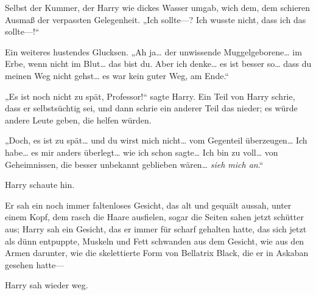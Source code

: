 Selbst der Kummer, der Harry wie dickes Wasser umgab, wich dem, dem schieren Ausmaß der verpassten Gelegenheit.
„Ich sollte—? Ich wusste nicht, dass ich das sollte—!“

Ein weiteres hustendes Glucksen.
„Ah ja… der unwissende Muggelgeborene… im Erbe, wenn nicht im Blut… das bist du. Aber ich denke… es ist besser so… dass du meinen Weg nicht gehst… es war kein guter Weg, am Ende.“

„Es ist noch nicht zu spät, Professor!“ sagte Harry.
Ein Teil von Harry schrie, dass er selbstsüchtig sei, und dann schrie ein anderer Teil das nieder; es würde andere Leute geben, die helfen würden.

„Doch, es ist zu spät… und du wirst mich nicht… vom Gegenteil überzeugen… Ich habe… es mir anders überlegt… wie ich schon sagte… Ich bin zu voll… von Geheimnissen, die besser unbekannt geblieben wären… \emph{sieh mich an}.“

Harry schaute hin.

Er sah ein noch immer faltenloses Gesicht, das alt und gequält aussah, unter einem Kopf, dem rasch die Haare ausfielen, sogar die Seiten sahen jetzt schütter aus; Harry sah ein Gesicht, das er immer für scharf gehalten hatte, das sich jetzt als dünn entpuppte, Muskeln und Fett schwanden aus dem Gesicht, wie aus den Armen darunter, wie die skelettierte Form von Bellatrix Black, die er in Askaban gesehen hatte—

Harry sah wieder weg.

